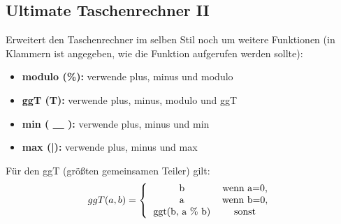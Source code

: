 \subsection{Ultimate Taschenrechner II }
Erweitert den Taschenrechner im selben Stil noch um weitere Funktionen (in Klammern ist angegeben, wie die Funktion aufgerufen werden sollte):
\begin{itemize}
    \item \textbf{\textcolor[rgb]{0,0.5,1}{modulo (\%):}} verwende plus, minus und modulo
    \item \textbf{\textcolor[rgb]{0,0.5,1}{ggT (T):}} verwende plus, minus, modulo und ggT
    \item \textbf{\textcolor[rgb]{0,0.5,1}{min ( \underline{\ \ } ):}} verwende plus, minus und min
    \item \textbf{\textcolor[rgb]{0,0.5,1}{max (|):}} verwende plus, minus und max
\end{itemize}
Für den ggT (größten gemeinsamen Teiler) gilt:
$$ggT(a,b)=\left\{\begin{tabular}{cc}b&wenn a=0,\\a&wenn b=0,\\ggt(b, a \% b)&sonst\end{tabular}\right.$$
